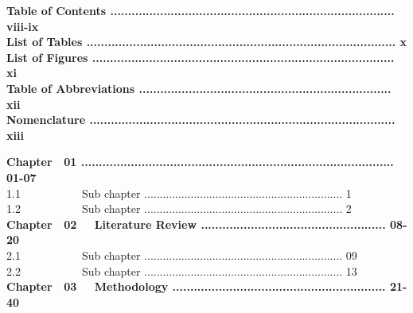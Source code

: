\documentclass[11pt,a4paper,oneside]{memoir}
\begin{document}
{\Large
\textbf{Table of Contents ................................................................................ viii-ix}
}\\

{\Large
\textbf{List of Tables ....................................................................................... x}
}\\

{\Large
\textbf{List of Figures ..................................................................................... xi}
}\\

{\Large
\textbf{Table of Abbreviations ....................................................................... xii}
}\\

{\Large
\textbf{Nomenclature ...................................................................................... xiii}
}\\

\vspace{0.5cm}

{\Large
\textbf{Chapter \,\,\,\,01 ........................................................................................ 01-07}
}\\

{\Large    1.1 \,\,\,\,\,\,\,\,\,\,\,\,\,\,\,\,\,\,\,\,\,\,\,\,\,\,\,\,\,\,\,Sub chapter ................................................................ 1}\\

{\Large     1.2 \,\,\,\,\,\,\,\,\,\,\,\,\,\,\,\,\,\,\,\,\,\,\,\,\,\,\,\,\,\,\,Sub chapter ................................................................ 2}\\

{\Large
\textbf{Chapter \,\,\,\,02 \,\,\,\,\, Literature Review .................................................... 08-20}
}\\

{\Large     2.1 \,\,\,\,\,\,\,\,\,\,\,\,\,\,\,\,\,\,\,\,\,\,\,\,\,\,\,\,\,\,\,Sub chapter ................................................................ 09}\\

{\Large     2.2 \,\,\,\,\,\,\,\,\,\,\,\,\,\,\,\,\,\,\,\,\,\,\,\,\,\,\,\,\,\,\,Sub chapter ................................................................ 13}\\

{\Large
\textbf{Chapter \,\,\,\,03 \,\,\,\,\, Methodology ............................................................ 21-40}
}\\
\end{document}
